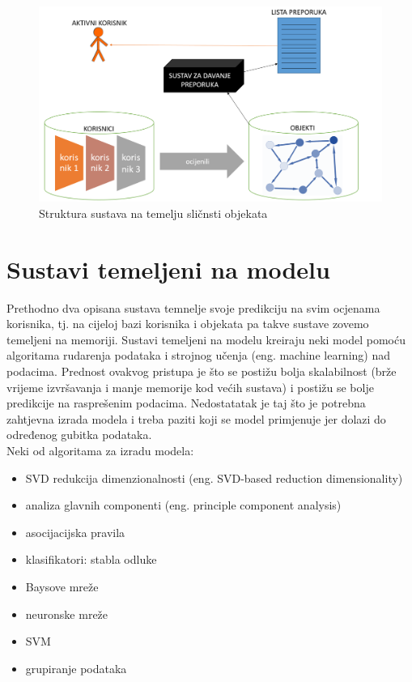 \documentclass[a4paper,oneside,12pt]{memoir} %
\begin{document}
\begin{figure}
\begin{center}
\includegraphics[scale=0.4]{slike/item-based.png}
\caption{Struktura sustava na temelju sličnsti objekata}
\end{center}
\end{figure}
%

\section{Sustavi temeljeni na modelu}
\label{sec: sustavi temeljeni na modelu}
%
Prethodno dva opisana sustava temnelje svoje predikciju na svim ocjenama korisnika, tj. na cijeloj bazi korisnika i objekata pa takve sustave zovemo temeljeni na memoriji. Sustavi temeljeni na modelu kreiraju neki model pomoću algoritama rudarenja podataka  i strojnog učenja (eng. machine learning) nad podacima. Prednost ovakvog pristupa je što se postižu bolja skalabilnost (brže vrijeme izvršavanja i manje memorije kod većih sustava) i postižu se bolje predikcije na rasprešenim podacima. Nedostatatak je taj što je potrebna zahtjevna izrada modela i treba paziti koji se model primjenuje jer dolazi do određenog gubitka podataka.
\bigskip
\\ Neki od algoritama za izradu modela:
\begin{itemize}
\item SVD redukcija dimenzionalnosti (eng. SVD-based reduction dimensionality)
\item analiza glavnih componenti (eng. principle component analysis)
\item asocijacijska pravila
\item klasifikatori: stabla odluke
\item 	Baysove mreže
\item 	neuronske mreže
\item 	SVM
\item grupiranje podataka
\end{itemize}
%
\end{document}

